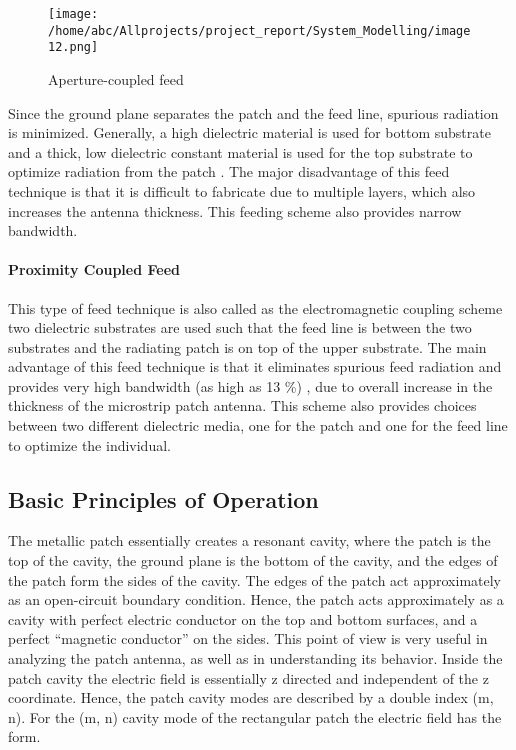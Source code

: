               \begin{figure}[H]
              	\centering
              	\texttt{[image: /home/abc/Allprojects/project\_report/System\_Modelling/image12.png]}
              	\caption{Aperture-coupled feed }
              \end{figure}

             Since the ground plane separates the patch and the feed line, spurious radiation is minimized. Generally, a high dielectric material is used for bottom substrate and a thick, low dielectric constant material is used for the top substrate to optimize radiation from the patch . The major disadvantage of this feed technique is that it is difficult to fabricate due to multiple layers, which also increases the antenna thickness. This feeding scheme also provides narrow bandwidth.

           \paragraph{ Proximity Coupled Feed}
            \justify
             This type of feed technique is also called as the electromagnetic coupling scheme two dielectric substrates are used such that the feed line is between the two substrates and the radiating patch is on top of the upper substrate. The main advantage of this feed technique is that it eliminates spurious feed radiation and provides very high bandwidth (as high as 13 \%) , due to overall increase in the thickness of the microstrip patch antenna. This scheme also provides choices between two different dielectric media, one for the patch and one for the feed line to optimize the individual.

         \subsection{ Basic Principles of Operation}
          \justify
           The  metallic  patch  essentially  creates  a  resonant  cavity,  where  the  patch  is  the  top  of  the cavity, the ground plane is the bottom of the cavity, and the edges of the patch form the sides of the cavity. The edges of the patch act approximately as an open-circuit boundary condition. Hence, the patch acts approximately as a cavity with perfect electric conductor on the top and bottom surfaces, and a perfect “magnetic conductor” on the sides. This point of view is very useful in analyzing the patch antenna, as well as in understanding its behavior. Inside the patch cavity the electric field is essentially z directed and independent of the z coordinate. Hence, the patch cavity modes are described by a double index (m, n). For the (m, n) cavity mode of the rectangular patch the electric field has the form. \\
           
